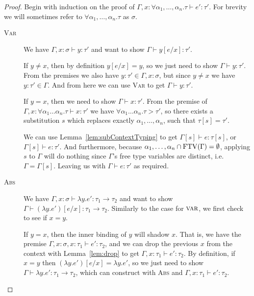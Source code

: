 \begin{proof}
  Begin with induction on the proof of $\Gamma , x : \forall \alpha_1, \ldots, \alpha_n . \tau \vdash e'
  : \tau'$. For brevity we will sometimes refer to $\forall \alpha_1,\ldots,\alpha_n . \tau$ as $\sigma$.
  \begin{description}
  \item[\rm\textsc{Var}] We have
    $\Gamma , x : \sigma \vdash y : \tau'$ and want to show $\Gamma \vdash y[e/x] : \tau'$.

    If $y \neq x$, then by definition $y [e/x] = y$, so we just need to
    show $\Gamma \vdash y : \tau'$. From the premises we also have
    $y : \tau' \in \Gamma , x : \sigma$, but since $y \ne x$ we have $y : \tau' \in \Gamma$. And
    from here we can use \textsc{Var} to get $\Gamma \vdash y : \tau'$.

    If $y = x$, then we need to show $\Gamma \vdash x : \tau'$. From the premise of
    ${\Gamma , x : \forall \alpha_1\ldots\alpha_n . \tau \vdash x : \tau'}$ we have
    ${\forall \alpha_1\ldots\alpha_n . \tau > \tau'}$, so there exists a substitution
    $s$ which replaces exactly $\alpha_1,\ldots,\alpha_n$, such that
    $\tau[s] = \tau'$.

    We can use Lemma~\ref{lem:subContextTyping} to get
    $\Gamma[s] \vdash e : \tau[s]$, or $\Gamma[s] \vdash e : \tau'$. And furthermore, because
    ${\alpha_1 , \ldots, \alpha_n \cap \operatorname{FTV}(\Gamma) = \emptyset}$, applying $s$ to $\Gamma$ will do
    nothing since $\Gamma$'s free type variables are distinct, i.e. $\Gamma =
    \Gamma[s]$. Leaving us with $\Gamma \vdash e : \tau'$ as required.

  \item[\rm\textsc{Abs}]
    We have $\Gamma , x : \sigma \vdash \lambda y . e' : \tau_1 \rightarrow \tau_2$ and want to show $\Gamma \vdash (\lambda y
    . e')[e/x] : \tau_1 \rightarrow \tau_2$. Similarly to the case for $\textsc{var}$, we
    first check to see if $x = y$.

    If $y = x$, then the inner binding of $y$ will shadow $x$. That
    is, we have the premise $\Gamma , x : \sigma, x : \tau_1 \vdash e' : \tau_2$, and we can
    drop the previous $x$ from the context with
    Lemma~\ref{lem:drop} to get $\Gamma , x : \tau_1 \vdash e' : \tau_2$.
    By definition, if $x = y$ then $(\lambda y . e')[e/x] = \lambda y . e'$, so we
    just need to show $\Gamma \vdash \lambda y . e' : \tau_1 \rightarrow \tau_2$, which can construct
    with \textsc{Abs} and $\Gamma , x : \tau_1 \vdash e' : \tau_2$.


\end{description}
\end{proof}
